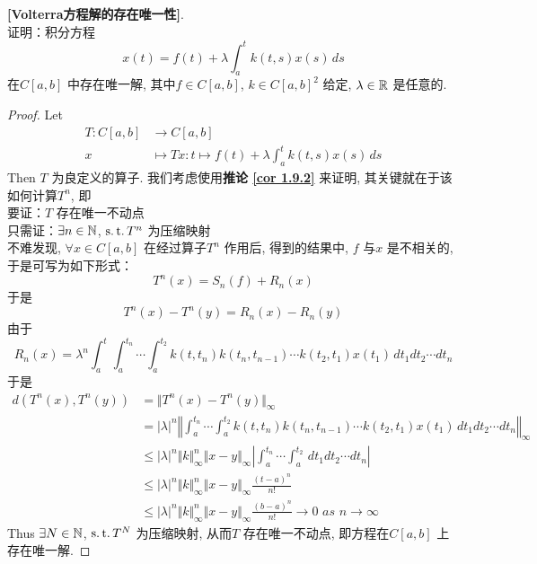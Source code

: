 	\begin{example}\label{ex 1.9.1}
		\textbf{[Volterra方程解的存在唯一性]}. \\
		证明：积分方程
		\[ x(t) = f(t) + \lambda \int_{a}^t k(t , s) x(s) \, ds \]
		在$C[a , b]$ 中存在唯一解, 其中$f \in C[a , b]$, $k \in C[a , b]^2$ 给定, $\lambda \in \mathbb{R}$ 是任意的.
		
		\vspace{2em}
		
		\begin{proof}
			Let
			\begin{align}
				T : C[a , b] &\longrightarrow C[a , b] \\
				x &\longmapsto Tx : t \longmapsto f(t) + \lambda \int_{a}^t k(t , s) x(s) \, ds
			\end{align}
			Then $T$ 为良定义的算子. 我们考虑使用\textbf{推论 \ref{cor 1.9.2}} 来证明, 其关键就在于该如何计算$T^n$, 即 \\
			要证：$T$ 存在唯一不动点 \\
			只需证：$\exists n \in \mathbb{N}$, $\operatorname{s.t.} T^n$ 为压缩映射 \\
			不难发现, $\forall x \in C[a , b]$ 在经过算子$T^n$ 作用后, 得到的结果中, $f$ 与$x$ 是不相关的, 于是可写为如下形式：
			\[ T^{n}(x) = S_{n}(f) + R_{n}(x) \]
			于是
			\[ T^{n}(x) - T^{n}(y) = R_{n}(x) - R_{n}(y) \]
			由于
			\[ R_{n}(x) = \lambda^n \int_{a}^{t} \int_{a}^{t_n} \cdots \int_{a}^{t_2} k(t , t_n) k(t_n , t_{n - 1}) \cdots k(t_2 , t_1) x(t_1) \, d t_1 d t_2 \cdots d t_n \]
			于是
			\begin{align}
				d(T^{n}(x) , T^{n}(y)) 
				&= \Vert T^{n}(x) - T^{n}(y) \Vert_\infty \\
				&= \left| \lambda \right|^n \left\Vert \int_{a}^{t_n} \cdots \int_{a}^{t_2} k(t , t_n) k(t_n , t_{n - 1}) \cdots k(t_2 , t_1) x(t_1) \, d t_1 d t_2 \cdots d t_n \right\Vert_\infty \\
				&\leq \left| \lambda \right|^n \Vert k \Vert_{\infty}^n \Vert x - y \Vert_{\infty} \left| \int_{a}^{t_n} \cdots \int_{a}^{t_2} \, d t_1 d t_2 \cdots d t_n \right| \\
				&\leq \left| \lambda \right|^n \Vert k \Vert_{\infty}^n \Vert x - y \Vert_{\infty} \frac{(t - a)^n}{n !} \\
				&\leq \left| \lambda \right|^n \Vert k \Vert_{\infty}^n \Vert x - y \Vert_{\infty} \frac{(b - a)^n}{n !} \to 0 \,\, as \,\, n \to \infty
			\end{align}
			Thus $\exists N \in \mathbb{N}$, $\operatorname{s.t.} T^N$ 为压缩映射, 从而$T$ 存在唯一不动点, 即方程在$C[a , b]$ 上存在唯一解.
		\end{proof}
	\end{example}


	\ifx\allfiles\undefined

\fi